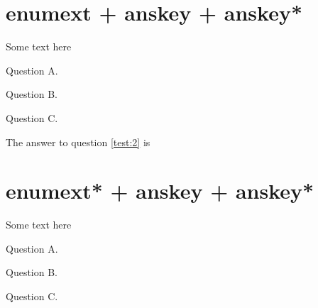 \documentclass{article}
\begin{document}
\section{enumext + anskey + anskey*}

Some text here

\begin{enumext}[save-ans=test,save-sep={ },save-ref = true]
  \item Question A. 
  \item Question B. 
  \item Question C.
\end{enumext}

The answer to question \ref{test:2} is 


\section{enumext* + anskey + anskey*}

Some text here

\begin{enumext*}[save-ans=test-2,save-sep={ },save-ref = true]
  \item Question A. 
  \item Question B. 
  \item Question C.
\end{enumext*}

\end{document}
